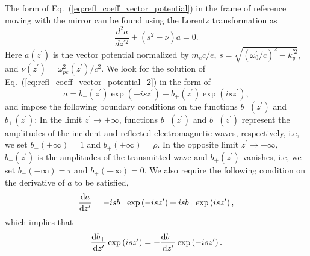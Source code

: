 \documentclass[10pt, a4paper, twoside, openright]{report}
\begin{document}
The form of Eq.~(\ref{eq:refl_coeff_vector_potential}) in the frame of reference moving with the mirror can be found using the Lorentz transformation as
\begin{equation}\label{eq:refl_coeff_vector_potential_2}
\frac{d^2 a}{d z^{\prime 2}}+ \left( s^2 - \nu \right) a = 0.
\end{equation}
Here $ a \left( z^{\prime} \right) $ is the vector potential normalized by $ m_e c / e $, $ s = \sqrt{ \left( \omega_0^{\prime} / c \right)^2 - k_y^{\prime 2}} $, and $ \nu \left( z^{\prime} \right) = \omega_{pe}^2\left( z^{\prime} \right) / c^2 $. We look for the solution of Eq.~(\ref{eq:refl_coeff_vector_potential_2}) in the form of
\begin{equation}\label{eq:vector_potential_form}
a = b_{-} \left( z^{\prime} \right) \exp \left( -i s z^{\prime} \right) + b_{+} \left( z^{\prime} \right) \exp \left( i s z^{\prime} \right),
\end{equation}
and impose the following boundary conditions on the functions $ b_{-} \left( z^{\prime} \right) $ and $ b_{+} \left( z^{\prime} \right) $: In the limit $ z^{\prime} \rightarrow +\infty $, functions $ b_{-} \left( z^{\prime} \right) $ and $ b_{+} \left( z^{\prime} \right) $ represent the amplitudes of the incident and reflected electromagnetic waves, respectively, i.e, we set $ b_{-} \left( +\infty \right) = 1 $ and $ b_{+} \left( +\infty \right) = \rho $. In the opposite limit $ z^{\prime} \rightarrow -\infty $, $ b_{-} \left( z^{\prime} \right) $ is the amplitudes of the transmitted wave and $ b_{+} \left( z^{\prime} \right) $ vanishes, i.e, we set $ b_{-} \left( -\infty \right) = \tau $ and $ b_{+} \left( -\infty \right) = 0 $. We also require the following condition on the derivative of $ a $ to be satisfied,
\begin{equation}\label{eq:boundary_condition_1}
\diff{a}{z^{\prime}} = -i s b_{-} \exp \left( -i s z^{\prime} \right) + i s b_{+} \exp \left( i s z^{\prime} \right),
\end{equation}
which implies that
\begin{equation}\label{eq:boundary_condition_2}
\diff{b_{+}}{z^{\prime}} \exp \left( i s z^{\prime} \right) = -\diff{b_{-}}{z^{\prime}} \exp \left( -i s z^{\prime} \right).
\end{equation}
\end{document}
